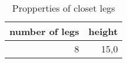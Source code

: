 \begin{table}[h!]
\centering
\caption{Propperties of closet legs}
\begin{tabular}{rr}
\toprule
 number of legs &  height \\
\midrule
              8 &    15,0 \\
\bottomrule
\end{tabular}
\end{table}
